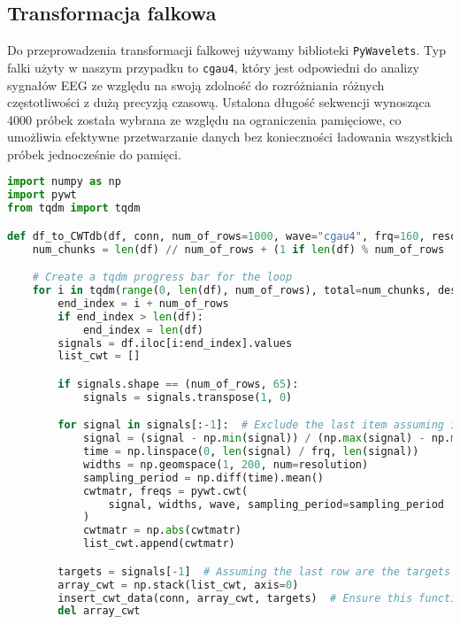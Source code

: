 \documentclass[12pt,twoside]{article}
\begin{document}
\subsection{Transformacja falkowa}
Do przeprowadzenia transformacji falkowej używamy biblioteki \texttt{PyWavelets}. Typ falki użyty w naszym przypadku to \texttt{cgau4}, który jest odpowiedni do analizy sygnałów EEG ze względu na swoją zdolność do rozróżniania różnych częstotliwości z dużą precyzją czasową. Ustalona długość sekwencji wynosząca 4000 próbek została wybrana ze względu na ograniczenia pamięciowe, co umożliwia efektywne przetwarzanie danych bez konieczności ładowania wszystkich próbek jednocześnie do pamięci.


\begin{lstlisting}[language=Python, caption={Przetwarzanie danych EEG za pomocą transformacji falkowej (CWT)}, label={lst:wavelet_transform}]
import numpy as np
import pywt
from tqdm import tqdm

def df_to_CWTdb(df, conn, num_of_rows=1000, wave="cgau4", frq=160, resolution=100):
    num_chunks = len(df) // num_of_rows + (1 if len(df) % num_of_rows != 0 else 0)

    # Create a tqdm progress bar for the loop
    for i in tqdm(range(0, len(df), num_of_rows), total=num_chunks, desc="Processing"):
        end_index = i + num_of_rows
        if end_index > len(df):
            end_index = len(df)
        signals = df.iloc[i:end_index].values
        list_cwt = []

        if signals.shape == (num_of_rows, 65):
            signals = signals.transpose(1, 0)

        for signal in signals[:-1]:  # Exclude the last item assuming it's the target
            signal = (signal - np.min(signal)) / (np.max(signal) - np.min(signal))
            time = np.linspace(0, len(signal) / frq, len(signal))
            widths = np.geomspace(1, 200, num=resolution)
            sampling_period = np.diff(time).mean()
            cwtmatr, freqs = pywt.cwt(
                signal, widths, wave, sampling_period=sampling_period
            )
            cwtmatr = np.abs(cwtmatr)
            list_cwt.append(cwtmatr)

        targets = signals[-1]  # Assuming the last row are the targets
        array_cwt = np.stack(list_cwt, axis=0)
        insert_cwt_data(conn, array_cwt, targets)  # Ensure this function is defined elsewhere in your code.
        del array_cwt
\end{lstlisting}
\end{document}
